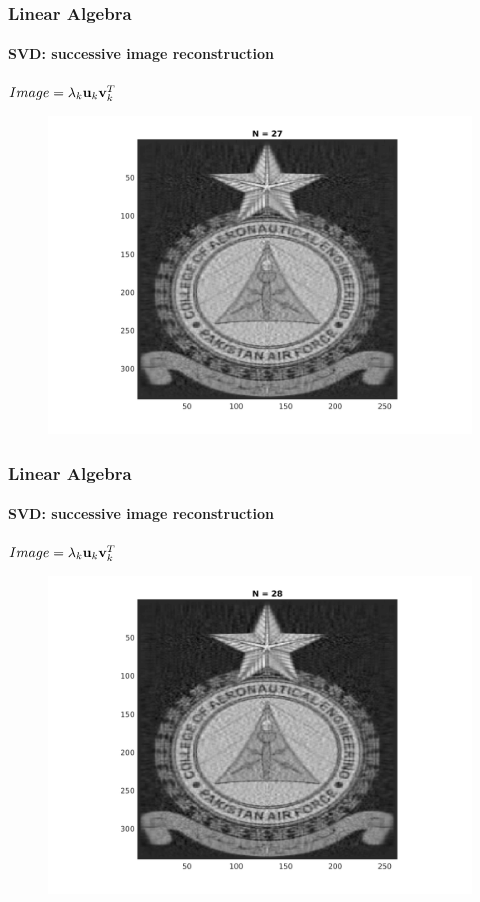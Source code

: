 \documentclass[hyperref={pdfpagelabels=true}]{beamer}
\begin{document}
\begin{frame}
\frametitle{Linear Algebra}
\framesubtitle{SVD: successive image reconstruction} 
\small{
\begin{center}
$Image = \lambda_k{\bf u}_k {\bf v}_k^T$
\end{center}}
\begin{figure}[!htb]
\centering
\includegraphics [scale=0.48]{n/b27.png}
\end{figure}
\end{frame}

\begin{frame}
\frametitle{Linear Algebra}
\framesubtitle{SVD: successive image reconstruction} 
\small{
\begin{center}
$Image = \lambda_k{\bf u}_k {\bf v}_k^T$
\end{center}}
\begin{figure}[!htb]
\centering
\includegraphics [scale=0.48]{n/b28.png}
\end{figure}
\end{frame}
\end{document}
